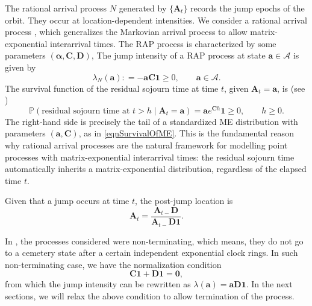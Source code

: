 \documentclass[a4paper,11pt]{article}
\numberwithin{equation}{section}
\theoremstyle{plain}
\theoremstyle{definition}
\newcommand{\1}{\mathbf{1}}
\begin{document}
The rational arrival process $N$ generated by $\{\bm{A}_t\}$ records the jump epochs of the orbit. 
They occur at location-dependent intensities. 
We consider a rational arrival process \cite{AsmussenBladt1999}, which generalizes the Markovian arrival process \cite{neuts1979versatile} to allow matrix-exponential interarrival times. 
The RAP process is characterized by some parameters $(\bm{\alpha}, \bm{C},\bm{D})$, 
The jump intensity of a RAP process at state $\bm{a} \in \mathcal{A}$ is given by
\begin{equation}\label{eq:jump_intensity}
\lambda_N(\bm{a}): = -\bm{a} \bm{C} \bm{1}\geq 0,\qquad \bm a\in \mathcal{A}.
\end{equation}
The survival function of the residual sojourn time at time $t$, given $\bm{A}_t = \bm{a}$, is (see \cite[Equation (2.5)]{BeanNguyenNielsenPeralta2022})
\begin{equation}\label{eq:no_jump_probability}
\mathbb{P}(\text{residual sojourn time at } t > h \mid \bm{A}_t = \bm{a}) = \bm{a} e^{\bm{C}h} \bm{1} \ge 0, \qquad h \ge 0.
\end{equation}
The right-hand side is precisely the tail of a standardized ME distribution with parameters $(\bm{a}, \bm{C})$, as in \eqref{eqnSurvivalOfME}. This is the fundamental reason why rational arrival processes are the natural framework for modelling point processes with matrix-exponential interarrival times: the residual sojourn time automatically inherits a matrix-exponential distribution, regardless of the elapsed time $t$.

Given that a jump occurs at time $t$, the post-jump location is
\begin{equation}\label{eq:jump_location}
\bm{A}_{t} = \frac{\bm{A}_{t-} \bm{D}}{\bm{A}_{t-} \bm{D} \bm{1}}.
\end{equation}

In \cite{AsmussenBladt1999}, the processes considered were non-terminating, which means, they do not go to a cemetery state after a certain independent exponential clock rings. In such non-terminating case, we have the normalization condition
\begin{equation}\label{eq:normalization_cd}
\bm{C}\bm{1} + \bm{D}\bm{1} = \bm{0},
\end{equation}
from which the jump intensity can be rewritten as $\lambda(\bm{a}) = \bm{a} \bm{D} \bm{1}$.
In the next sections, we will relax the above condition to allow termination of the process.
\end{document}
